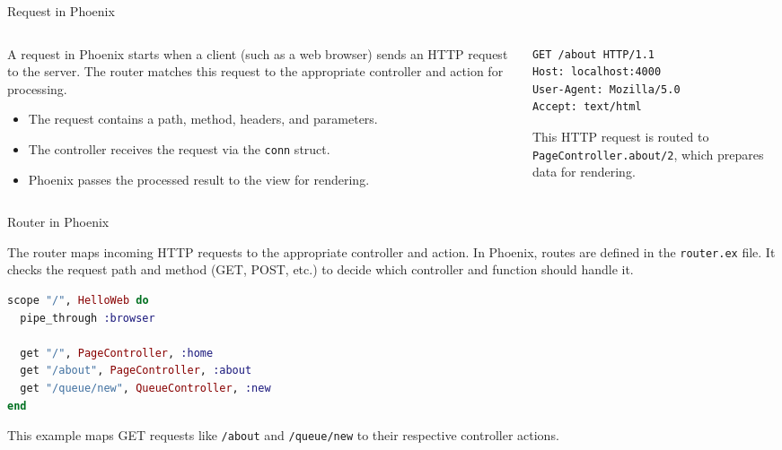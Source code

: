 \documentclass[aspectratio=169, table]{beamer}
\begin{document}
\begin{frame}[fragile]{Request in Phoenix}
\vspace*{20pt}

\begin{columns}
  \begin{column}[T]{0.52\textwidth}
    A request in Phoenix starts when a client (such as a web browser)  
    sends an HTTP request to the server. The router matches this request  
    to the appropriate controller and action for processing.

    \begin{itemize}
      \item The request contains a path, method, headers, and parameters.
      \item The controller receives the request via the \texttt{conn} struct.
      \item Phoenix passes the processed result to the view for rendering.
    \end{itemize}
  \end{column}

  \begin{column}[T]{0.43\textwidth}
\begin{lstlisting}[language=bash]
GET /about HTTP/1.1
Host: localhost:4000
User-Agent: Mozilla/5.0
Accept: text/html
\end{lstlisting}

This HTTP request is routed to  
\texttt{PageController.about/2},  
which prepares data for rendering.
  \end{column}
\end{columns}
\end{frame}


\begin{frame}[fragile]{Router in Phoenix}
\vspace{20pt}

The router maps incoming HTTP requests to the appropriate controller and action.  
In Phoenix, routes are defined in the \texttt{router.ex} file. It checks the request path and method (GET, POST, etc.) to decide which controller and function should handle it.

\begin{lstlisting}[language=Elixir]
scope "/", HelloWeb do
  pipe_through :browser

  get "/", PageController, :home
  get "/about", PageController, :about
  get "/queue/new", QueueController, :new
end
\end{lstlisting}

This example maps GET requests like \texttt{/about} and \texttt{/queue/new} to their respective controller actions.
\end{frame}
\end{document}
